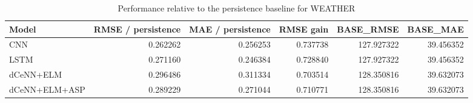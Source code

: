 \begin{table}
\caption{Performance relative to the persistence baseline for WEATHER}
\begin{tabular}{lrrrrr}
\toprule
Model & RMSE / persistence & MAE / persistence & RMSE gain & BASE\_RMSE & BASE\_MAE \\
\midrule
CNN & 0.262262 & 0.256253 & 0.737738 & 127.927322 & 39.456352 \\
LSTM & 0.271160 & 0.246384 & 0.728840 & 127.927322 & 39.456352 \\
dCeNN+ELM & 0.296486 & 0.311334 & 0.703514 & 128.350816 & 39.632073 \\
dCeNN+ELM+ASP & 0.289229 & 0.271044 & 0.710771 & 128.350816 & 39.632073 \\
\bottomrule
\end{tabular}
\end{table}
